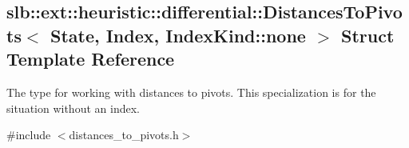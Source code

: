 \hypertarget{structslb_1_1ext_1_1heuristic_1_1differential_1_1DistancesToPivots_3_01State_00_01Index_00_01IndexKind_1_1none_01_4}{}\subsection{slb\+:\+:ext\+:\+:heuristic\+:\+:differential\+:\+:Distances\+To\+Pivots$<$ State, Index, Index\+Kind\+:\+:none $>$ Struct Template Reference}
\label{structslb_1_1ext_1_1heuristic_1_1differential_1_1DistancesToPivots_3_01State_00_01Index_00_01IndexKind_1_1none_01_4}


The type for working with distances to pivots. This specialization is for the situation without an index.  




{\ttfamily \#include $<$distances\+\_\+to\+\_\+pivots.\+h$>$}

